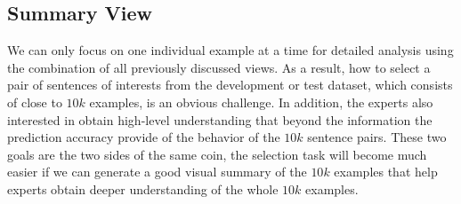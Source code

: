 \subsection{Summary View}
\label{sec:allPairs}
We can only focus on one individual example at a time for detailed analysis using the combination of all previously discussed views. As a result, how to select a pair of sentences of interests from the development or test dataset, which consists of close to $10k$ examples, is an obvious challenge.
In addition, the experts also interested in obtain high-level understanding that beyond the information the prediction accuracy provide of the behavior of the $10k$ sentence pairs.
%
These two goals are the two sides of the same coin, the selection task will become much easier if we can generate a good visual summary of the $10k$ examples that help experts obtain deeper understanding of the whole $10k$ examples.

